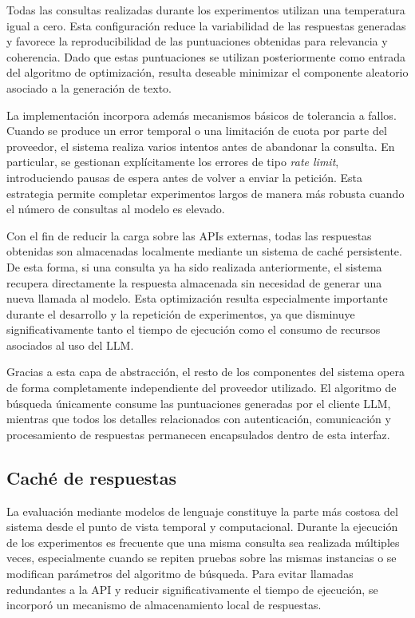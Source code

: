 \documentclass[12pt,a4paper]{article}
\begin{document}
Todas las consultas realizadas durante los experimentos utilizan una temperatura igual a cero. Esta configuración reduce la variabilidad de las respuestas generadas y favorece la reproducibilidad de las puntuaciones obtenidas para relevancia y coherencia. Dado que estas puntuaciones se utilizan posteriormente como entrada del algoritmo de optimización, resulta deseable minimizar el componente aleatorio asociado a la generación de texto.

La implementación incorpora además mecanismos básicos de tolerancia a fallos. Cuando se produce un error temporal o una limitación de cuota por parte del proveedor, el sistema realiza varios intentos antes de abandonar la consulta. En particular, se gestionan explícitamente los errores de tipo \textit{rate limit}, introduciendo pausas de espera antes de volver a enviar la petición. Esta estrategia permite completar experimentos largos de manera más robusta cuando el número de consultas al modelo es elevado.

Con el fin de reducir la carga sobre las APIs externas, todas las respuestas obtenidas son almacenadas localmente mediante un sistema de caché persistente. De esta forma, si una consulta ya ha sido realizada anteriormente, el sistema recupera directamente la respuesta almacenada sin necesidad de generar una nueva llamada al modelo. Esta optimización resulta especialmente importante durante el desarrollo y la repetición de experimentos, ya que disminuye significativamente tanto el tiempo de ejecución como el consumo de recursos asociados al uso del LLM.

Gracias a esta capa de abstracción, el resto de los componentes del sistema opera de forma completamente independiente del proveedor utilizado. El algoritmo de búsqueda únicamente consume las puntuaciones generadas por el cliente LLM, mientras que todos los detalles relacionados con autenticación, comunicación y procesamiento de respuestas permanecen encapsulados dentro de esta interfaz.

\subsection{Caché de respuestas}

La evaluación mediante modelos de lenguaje constituye la parte más costosa del sistema desde el punto de vista temporal y computacional. Durante la ejecución de los experimentos es frecuente que una misma consulta sea realizada múltiples veces, especialmente cuando se repiten pruebas sobre las mismas instancias o se modifican parámetros del algoritmo de búsqueda. Para evitar llamadas redundantes a la API y reducir significativamente el tiempo de ejecución, se incorporó un mecanismo de almacenamiento local de respuestas.
\end{document}

